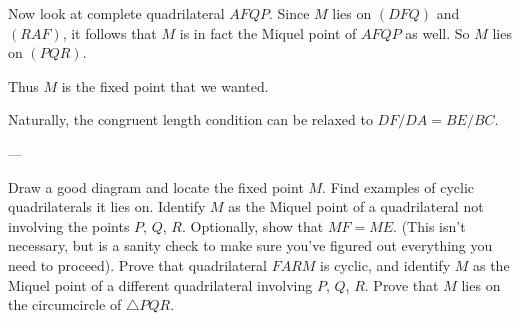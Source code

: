 Now look at complete quadrilateral $AFQP$.
Since $M$ lies on $(DFQ)$ and $(RAF)$,
it follows that $M$ is in fact the Miquel point of $AFQP$ as well.
So $M$ lies on $(PQR)$.

Thus $M$ is the fixed point that we wanted.

\begin{remark*}
  Naturally, the congruent length
  condition can be relaxed to $DF/DA = BE/BC$.
\end{remark*}

---

\begin{walk}
  \ii Draw a good diagram and locate the fixed point $M$.
  Find examples of cyclic quadrilaterals it lies on.
  \ii Identify $M$ as the Miquel point of a quadrilateral
  not involving the points $P$, $Q$, $R$.
  \ii Optionally, show that $MF = ME$.
  (This isn't necessary, but is a sanity check to
  make sure you've figured out everything you need to proceed).
  \ii Prove that quadrilateral $FARM$ is cyclic,
  and identify $M$ as the Miquel point
  of a different quadrilateral involving $P$, $Q$, $R$.
  \ii Prove that $M$ lies on the circumcircle of $\triangle PQR$.
\end{walk}

